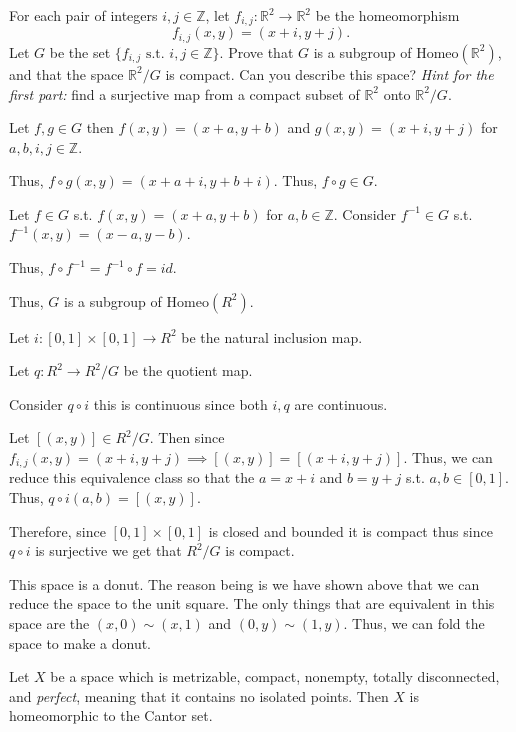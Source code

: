 \documentclass[12pt, letterpaper]{article}
\newcommand{\R}{\mathbb{R}}
\newcommand{\Z}{\mathbb{Z}}
\renewcommand{\t}[1]{\text{#1}}
\begin{document}
\begin{subproblem}{}
    For each pair of integers $i,j \in \Z$, let
    $f_{i,j}:\R^2 \to \R^2$ be the homeomorphism
    \[
      f_{i,j}(x, y) = (x + i, y + j).
    \]
    Let $G$ be the set $\{f_{i,j} \t{ s.t. } i,j \in \Z\}$. Prove that $G$ is
    a subgroup of $\t{Homeo}(\R^2)$, and that the space $\R^2/G$ is
    compact. Can you describe this space? \textit{Hint for the first
      part:} find a surjective map from a compact subset of $\R^2$
    onto $\R^2 / G$.
\end{subproblem}
\begin{problemproof}
    Let $f,g \in G$ then $f(x,y)=(x+a,y+b)$ and $g(x,y)=(x+i,y+j)$ for $a,b,i,j \in \Z$.

    Thus, $f \circ g(x,y)=(x+a+i,y+b+i)$. Thus, $f \circ g \in G$.

    Let $f \in G$ s.t. $f(x,y)=(x+a,y+b)$ for $a,b \in \Z$. Consider $f^{-1} \in G$ s.t. $f^{-1}(x,y)=(x-a,y-b)$.

    Thus, $f \circ f^{-1}=f^{-1} \circ f=id$.

    Thus, $G$ is a subgroup of $\t{Homeo}(R^2)$.

    Let $i: [0,1] \times [0,1] \to R^2$ be the natural inclusion map.

    Let $q : R^2 \to R^2/G$ be the quotient map.

    Consider $q \circ i$ this is continuous since both $i,q$ are continuous.

    Let $[(x,y)] \in R^2/G$. Then since $f_{i,j}(x,y)=(x+i,y+j) \implies [(x,y)]=[(x+i,y+j)]$. Thus, we can reduce this equivalence class so that the $a=x+i$ and $b=y+j$ s.t. $a,b \in [0,1]$. Thus, $q \circ i(a,b)=[(x,y)]$.

    Therefore, since $[0,1] \times [0,1]$ is closed and bounded it is compact thus since $q \circ i$ is surjective we get that $R^2/G$ is compact.

    This space is a donut. The reason being is we have shown above that we can reduce the space to the unit square. The only things that are equivalent in this space are the $(x,0) \sim (x,1)$ and $(0,y) \sim (1,y)$. Thus, we can fold the space to make a donut.
\end{problemproof}

\begin{problem}{}
    Let $X$ be a space which is metrizable, compact, nonempty, totally
    disconnected, and \emph{perfect}, meaning that it contains no
    isolated points. Then $X$ is homeomorphic to the Cantor set.
\end{problem}
\end{document}
